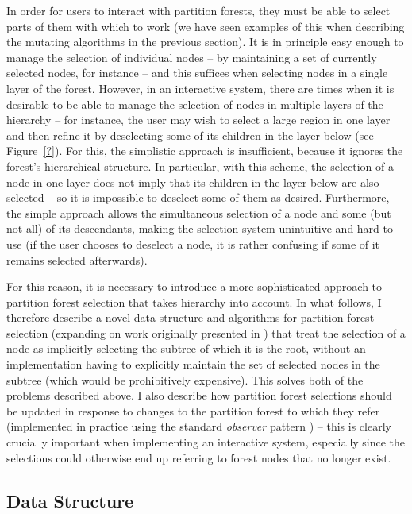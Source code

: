 In order for users to interact with partition forests, they must be able to select parts of them with which to work (we have seen examples of this when describing the mutating algorithms in the previous section). It is in principle easy enough to manage the selection of individual nodes -- by maintaining a set of currently selected nodes, for instance -- and this suffices when selecting nodes in a single layer of the forest. However, in an interactive system, there are times when it is desirable to be able to manage the selection of nodes in multiple layers of the hierarchy -- for instance, the user may wish to select a large region in one layer and then refine it by deselecting some of its children in the layer below (see Figure~\ref{?}). For this, the simplistic approach is insufficient, because it ignores the forest's hierarchical structure. In particular, with this scheme, the selection of a node in one layer does not imply that its children in the layer below are also selected -- so it is impossible to deselect some of them as desired. Furthermore, the simple approach allows the simultaneous selection of a node and some (but not all) of its descendants, making the selection system unintuitive and hard to use (if the user chooses to deselect a node, it is rather confusing if some of it remains selected afterwards).

For this reason, it is necessary to introduce a more sophisticated approach to partition forest selection that takes hierarchy into account. In what follows, I therefore describe a novel data structure and algorithms for partition forest selection (expanding on work originally presented in \cite{gvcispa09}) that treat the selection of a node as implicitly selecting the subtree of which it is the root, without an implementation having to explicitly maintain the set of selected nodes in the subtree (which would be prohibitively expensive). This solves both of the problems described above. I also describe how partition forest selections should be updated in response to changes to the partition forest to which they refer (implemented in practice using the standard \emph{observer} pattern \cite{gamma95}) -- this is clearly crucially important when implementing an interactive system, especially since the selections could otherwise end up referring to forest nodes that no longer exist.

\subsection{Data Structure}

